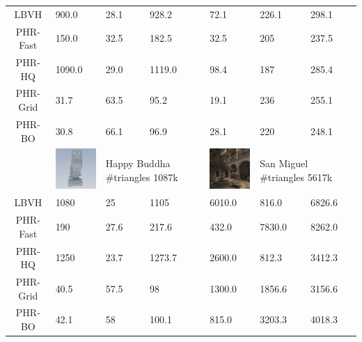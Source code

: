 \begin{table}
\begin{tabular}{ | c | m{3.5em} | m{3.5em} | m{3.5em} | m{3.5em} | m{3.5em} |  m{3.5em}|}
\hline
LBVH & 900.0 & 28.1 & 928.2              &  72.1 & 226.1 & 298.1\\
PHR-Fast & 150.0 & 32.5 & 182.5            &  32.5 & 205 & 237.5\\
PHR-HQ & 1090.0 & 29.0 & 1119.0              &  98.4 & 187  &285.4\\
\hline
PHR-Grid & 31.7 & 63.5 & 95.2            & 19.1 & 236 & 255.1  \\
PHR-BO & 30.8 & 66.1 & 96.9              & 28.1 & 220 & 248.1 \\
\hline
& \multicolumn{1}{|m{4.5em}}{\includegraphics[width=60pt]{images/buddha.png}} & \multicolumn{2}{m{4em}|}{Happy Buddha \#triangles 1087k}

& \multicolumn{1}{|m{4.5em}}{\includegraphics[width=60pt]{images/san_miguel.png}} &     \multicolumn{2}{m{4.5em}|}{San Miguel \#triangles 5617k}\\


\hline
LBVH & 1080 & 25 & 1105                    & 6010.0 & 816.0 & 6826.6 \\                   
PHR-Fast & 190 & 27.6 & 217.6                   & 432.0 & 7830.0 & 8262.0 \\
PHR-HQ & 1250 & 23.7 & 1273.7                     & 2600.0 & 812.3 & 3412.3 \\
\hline
PHR-Grid & 40.5 & 57.5 &98                   & 1300.0 & 1856.6 & 3156.6  \\
PHR-BO & 42.1 &58 &100.1                     & 815.0 & 3203.3 & 4018.3 \\
\hline
\end{tabular}
\end{table}
\cleardoublepage